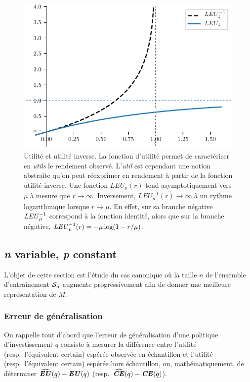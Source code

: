 \begin{figure}[ht]
  \includegraphics[width=\textwidth]{../experiments/fig/leu_inv.pdf}
  \caption{Utilité et utilité inverse. La fonction d'utilité permet de caractériser en
    \textit{utils} le rendement observé. L'\textit{util} est cependant une notion
    abstraite qu'on peut réexprimer en rendement à partir de la fonction utilité
    inverse. Une fonction $LEU_\mu(r)$ tend asymptotiquement vers $\mu$ à mesure que
    $r\to \infty$. Inversement, $LEU_\mu^{-1}(r)\to\infty$ à un rythme logarithmique lorsque
    $r\to\mu$. En effet, sur sa branche négative $\LEU_\mu^{-1}$ correspond à la fonction
    identité, alors que sur la branche négative, $\LEU_\mu^{-1}(r) = -\mu\log(1-r/\mu)$.}
  \label{fig_leu_inv}
\end{figure}

\clearpage


\subsection{\textit{n} variable, \textit{p} constant}
\label{emp:nvar}

L'objet de cette section est l'étude du cas canonique où la taille $n$ de l'ensemble
d'entraînement $\S_n$ augmente progressivement afin de donner une meilleure représentation
de $M$.


\subsubsection{Erreur de généralisation}

On rappelle tout d'abord que l'erreur de généralisation d'une politique d'investissement
$q$ consiste à mesurer la différence entre l'utilité (resp.~l'équivalent certain) espérée
observée en échantillon et l'utilité (resp.~l'équivalent certain) espérée hors
échantillon, ou, mathématiquement, de déterminer $\hEU(q) - \EU(q)$
(resp.~$\hCE(q) - \CE(q)$).

